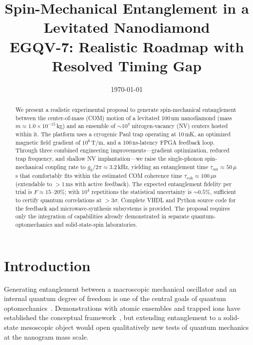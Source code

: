 \documentclass[12pt,a4paper]{article}
\title{\textbf{Spin-Mechanical Entanglement in a Levitated Nanodiamond}\\[0.5em]
       \large EGQV-7: Realistic Roadmap with Resolved Timing Gap}
\author{}
\date{\today}
\begin{document}
\maketitle

\begin{abstract}
We present a realistic experimental proposal to generate spin-mechanical entanglement
between the center-of-mass (COM) motion of a levitated 100\,nm nanodiamond
(mass $m \approx 1.0\times10^{-15}$\,kg) and an ensemble of ${\sim}10^3$ nitrogen-vacancy
(NV) centers hosted within it. The platform uses a cryogenic Paul trap operating
at 10\,mK, an optimized magnetic field gradient of $10^6$\,T/m, and a 100\,ns-latency
FPGA feedback loop. Through three combined engineering improvements---gradient
optimization, reduced trap frequency, and shallow NV implantation---we raise the
single-phonon spin-mechanical coupling rate to $g_0/2\pi \approx 3.2$\,kHz, yielding
an entanglement time $\tau_{\mathrm{ent}} \approx 50\,\mu$s that comfortably fits within the
estimated COM coherence time $\tau_{\mathrm{coh}} \approx 100\,\mu$s (extendable to
${>}1$\,ms with active feedback). The expected entanglement fidelity per trial is
$F \approx 15$--$20\%$; with $10^4$ repetitions the statistical uncertainty is
${\sim}0.5\%$, sufficient to certify quantum correlations at ${>}3\sigma$. Complete
VHDL and Python source code for the feedback and microwave-synthesis subsystems
is provided. The proposal requires only the integration of capabilities already
demonstrated in separate quantum-optomechanics and solid-state-spin laboratories.
\end{abstract}

\tableofcontents

\newpage

\section{Introduction}

Generating entanglement between a macroscopic mechanical oscillator and an
internal quantum degree of freedom is one of the central goals of quantum
optomechanics~\cite{Aspelmeyer2014}. Demonstrations with atomic ensembles and
trapped ions have established the conceptual framework~\cite{Hammerer2010}, but
extending entanglement to a solid-state mesoscopic object would open qualitatively
new tests of quantum mechanics at the nanogram mass scale.
\end{document}
